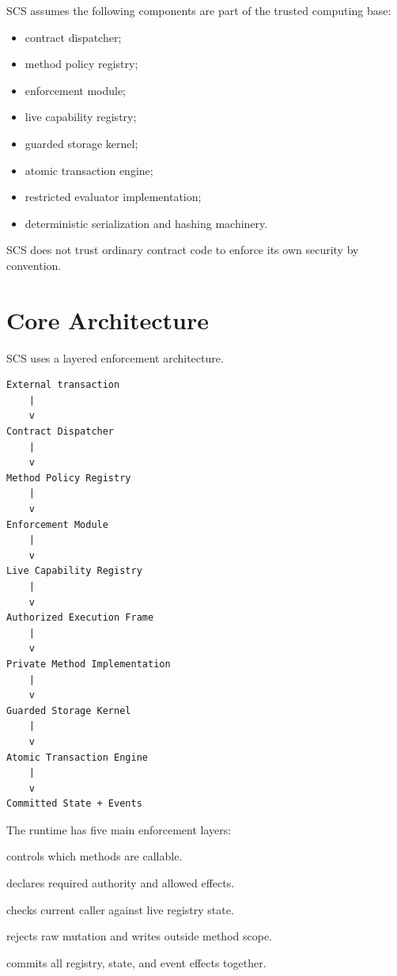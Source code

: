 \documentclass[11pt]{article}
\newcommand{\SCS}{\textsc{SCS}}
\begin{document}
\SCS{} assumes the following components are part of the trusted computing base:

\begin{itemize}
  \item contract dispatcher;
  \item method policy registry;
  \item enforcement module;
  \item live capability registry;
  \item guarded storage kernel;
  \item atomic transaction engine;
  \item restricted evaluator implementation;
  \item deterministic serialization and hashing machinery.
\end{itemize}

\SCS{} does not trust ordinary contract code to enforce its own security by convention.



\section{Core Architecture}

\SCS{} uses a layered enforcement architecture.

\begin{lstlisting}
External transaction
    |
    v
Contract Dispatcher
    |
    v
Method Policy Registry
    |
    v
Enforcement Module
    |
    v
Live Capability Registry
    |
    v
Authorized Execution Frame
    |
    v
Private Method Implementation
    |
    v
Guarded Storage Kernel
    |
    v
Atomic Transaction Engine
    |
    v
Committed State + Events
\end{lstlisting}

The runtime has five main enforcement layers:

\begin{description}[leftmargin=2.8cm]
  \item[Dispatcher] controls which methods are callable.
  \item[Method policy registry] declares required authority and allowed effects.
  \item[Enforcement module] checks current caller against live registry state.
  \item[Guarded storage kernel] rejects raw mutation and writes outside method scope.
  \item[Atomic transaction engine] commits all registry, state, and event effects together.
\end{description}
\end{document}
